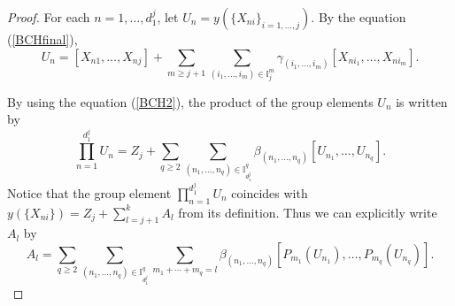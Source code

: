 \documentclass[pdftex]{sigma}
\numberwithin{equation}{section}
\begin{document}
\begin{proof}
For each $n=1,\dots,d_1^j$,
let $U_n=y(\{X_{ni}\}_{i=1,\dots,j})$.
By the equation (\ref{BCHfinal}),
 \begin{equation}\label{equn}
 U_n=[X_{n1},\dots,X_{nj}]+\sum_{m\geq j+1}\sum_{(i_1,\dots,i_m)\in\mathbb{I}_j^m}\gamma_{(i_1,\dots,i_m)}[X_{ni_1},\dots,X_{ni_m}].
 \end{equation}

By using the equation (\ref{BCH2}),
the product of the group elements $U_n$ is written by
\[
 \prod_{n=1}^{d_1^j}U_n=Z_j+\sum_{q\geq2}\sum_{(n_1,\dots,n_q)\in \mathbb{I}_{d_1^j}^q}\beta_{(n_1,\dots,n_q)}[U_{n_1},\dots,U_{n_q}].
\]
Notice that the group element $\prod_{n=1}^{d_1^j}U_n$ coincides with $y(\{X_{ni}\})=Z_j+\sum_{l=j+1}^{k}A_l$ from its definition.
Thus we can explicitly write $A_l$ by
\[
A_l=\sum_{q\geq 2}\sum_{(n_1,\dots,n_q)\in\mathbb{I}_{d_1^j}^q}\sum_{m_1+\cdots +m_q=l}\beta_{(n_1,\dots,n_q)}[P_{m_1}(U_{n_1}),\dots,P_{m_q}(U_{n_q})].
\]


\end{proof}
\end{document}
